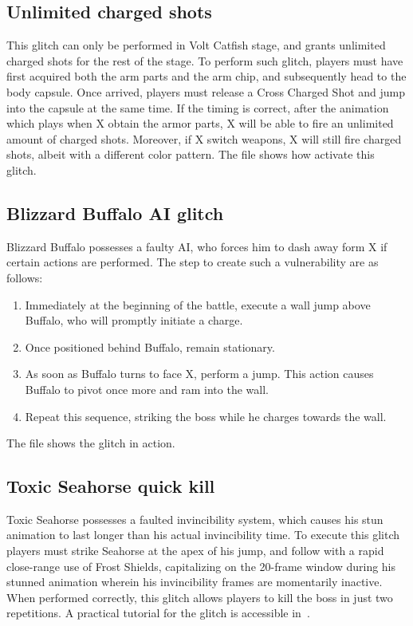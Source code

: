 \subsection{Unlimited charged shots}
This glitch can only be performed in Volt Catfish stage, and grants unlimited charged shots for the rest of the stage. To perform such glitch, players must have first acquired both the arm parts and the arm chip, and subsequently head to the body capsule. Once arrived, players must release a Cross Charged Shot and jump into the capsule at the same time. If the timing is correct, after the animation which plays when X obtain the armor parts, X will be able to fire an unlimited amount of charged shots. Moreover, if X switch weapons, X will still fire charged shots, albeit with a different color pattern. The file  shows how activate this glitch.

\subsection{Blizzard Buffalo AI glitch}\label{glitch:Buffalo_AI}
Blizzard Buffalo possesses a faulty AI, who forces him to dash away form X if certain actions are performed. The step to create such a vulnerability are as follows:
\begin{enumerate}
	\item Immediately at the beginning of the battle, execute a wall jump above Buffalo, who will promptly initiate a charge.
	\item Once positioned behind Buffalo, remain stationary.
	\item As soon as Buffalo turns to face X, perform a jump. This action causes Buffalo to pivot once more and ram into the wall.
	\item Repeat this sequence, striking the boss while he charges towards the wall.
\end{enumerate}

The file  shows the glitch in action.

\subsection{Toxic Seahorse quick kill}\label{glitch:Sehorse}
Toxic Seahorse possesses a faulted invincibility system, which causes his stun animation to last longer than his actual invincibility time. To execute this glitch players must strike Seahorse at the apex of his jump, and follow with a rapid close-range use of Frost Shields, capitalizing on the 20-frame window during his stunned animation wherein his invincibility frames are momentarily inactive. When performed correctly, this glitch allows players to kill the boss in just two repetitions. A practical tutorial for the glitch is accessible in~\cite{video:seahorse_two_cicle}. 
 
